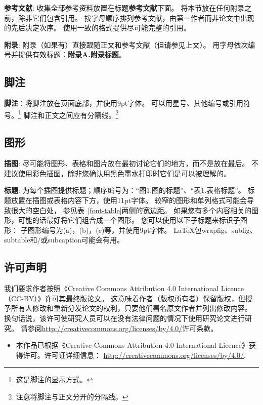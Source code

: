 \documentclass[11pt]{article}
\begin{document}
\begin{CJK*}{UTF8}{gbsn}
\textbf{参考文献}:
收集全部参考资料放置在标题{\bf 参考文献}下面。
将本节放在任何附录之前，除非它们包含引用。
按字母顺序排列参考文献，由第一作者而非论文中出现的先后决定次序。
使用一致的格式提供尽可能完整的引用。

{\bf 附录}:
附录（如果有）直接跟随正文和参考文献（但请参见上文）。
用字母依次编号并提供有效标题：{\bf 附录A.附录标题}。

\subsection{脚注}

{\bf 脚注}：将脚注放在页面底部，并使用9pt字体。
可以用星号、其他编号或引用符号。\footnote{这是脚注的显示方式。}
脚注和正文之间应有分隔线。\footnote {注意将脚注与正文分开的分隔线。}

\subsection{图形}

{\bf 插图}:
尽可能将图形、表格和图片放在最初讨论它们的地方，而不是放在最后。
不建议使用彩色插图，除非您确认用黑色墨水打印时它们是可以被理解的。

{\bf 标题}:
为每个插图提供标题；顺序编号为：“图1.图的标题”、“表1.表格标题”。
标题放置在插图或表格内容下方，使用11pt字体。
较窄的图形和单列格式可能会导致很大的空白处，
参见表~\ref{font-table}两侧的宽边距。
如果您有多个内容相关的图形，可能的话最好将它们组合成一个图形。
您可以使用以下子标题来标识子图形：
子图形编号为(a)，(b)，(c)等，并使用9pt字体。
\LaTeX{}包wrapfig、subfig、subtable和/或subcaption可能会有用。

\subsection{许可声明}
\label{licence}

我们要求作者按照《Creative Commons Attribution 4.0 International Licence（CC-BY）》许可其最终版论文。
这意味着作者（版权所有者）保留版权，但授予所有人修改和重新分发论文的权利，只要他们署名原文作者并列出修改内容。
换句话说，该许可使研究人员可以在没有法律问题的情况下使用研究论文进行研究。
请参阅\url{http://creativecommons.org/licenses/by/4.0/}许可条款。

\begin{itemize}
    \item 本作品已根据《Creative Commons Attribution 4.0 International Licence》获得许可。许可证详细信息：
    \url{http://creativecommons.org/licenses/by/4.0/}.
\end{itemize}


\end{CJK*}
\end{document}
